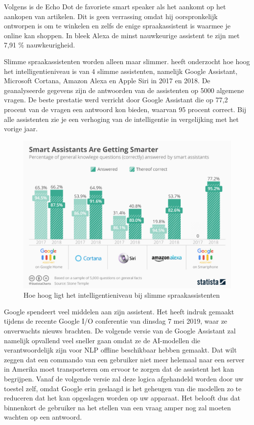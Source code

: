 Volgens \autocite{Lopez2018} is de Echo Dot de favoriete smart speaker als het aankomt op het aankopen van artikelen. Dit is geen verrassing omdat hij oorspronkelijk ontworpen is om te winkelen en zelfs de enige spraakassistent is waarmee je online kan shoppen. In \autocite{Tulshan2019} bleek Alexa de minst nauwkeurige assistent te zijn met 7,91 \% nauwkeurigheid.

Slimme spraakassistenten worden alleen maar slimmer. \autocite{Brandt2018} heeft onderzocht hoe hoog het intelligentieniveau is van 4 slimme assistenten, namelijk Google Assistant, Microsoft Cortana, Amazon Alexa en Apple Siri in 2017 en 2018. De geanalyseerde gegevens zijn de antwoorden van de assistenten op 5000 algemene vragen. De beste prestatie werd verricht door Google Assistant die op 77,2 procent van de vragen een antwoord kon bieden, waarvan 95 procent correct. Bij alle assistenten zie je een verhoging van de intelligentie in vergelijking met het vorige jaar.

\begin{figure}[h]
    \includegraphics[width=0.7\linewidth]{img/SmartAssistantsAreGettingSmarter}
    \caption{Hoe hoog ligt het intelligentieniveau bij slimme spraakassistenten \autocite{Brandt2018}}
    \label{fig:smartassistantsaregettingsmarter}
\end{figure}

Google spendeert veel middelen aan zijn assistent. Het heeft indruk gemaakt tijdens de recente Google I/O conferentie van dinsdag 7 mei 2019, waar ze onverwachts nieuws brachten. De volgende versie van de Google Assistant zal namelijk opvallend veel sneller gaan omdat ze de \gls{AI}-modellen die verantwoordelijk zijn voor \gls{NLP} offline beschikbaar hebben gemaakt. Dat wilt zeggen dat een commando van een gebruiker niet meer helemaal naar een server in Amerika moet transporteren om ervoor te zorgen dat de assistent het kan begrijpen. Vanaf de volgende versie zal deze logica afgehandeld worden door uw toestel zelf, omdat Google erin geslaagd is het geheugen van die modellen zo te reduceren dat het kan opgeslagen worden op uw apparaat. Het belooft dus dat binnenkort de gebruiker na het stellen van een vraag amper nog zal moeten wachten op een antwoord.

